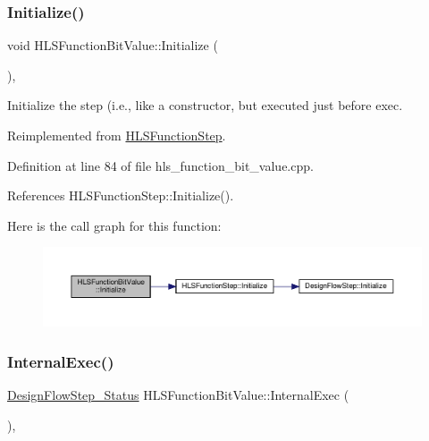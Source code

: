 \subsubsection{\texorpdfstring{Initialize()}{Initialize()}}
{\footnotesize\ttfamily void H\+L\+S\+Function\+Bit\+Value\+::\+Initialize (\begin{DoxyParamCaption}{ }\end{DoxyParamCaption})\hspace{0.3cm}{\ttfamily [override]}, {\ttfamily [virtual]}}



Initialize the step (i.\+e., like a constructor, but executed just before exec. 



Reimplemented from \hyperlink{classHLSFunctionStep_a966629ba62a8188ff4fa783ab0d4e319}{H\+L\+S\+Function\+Step}.



Definition at line 84 of file hls\+\_\+function\+\_\+bit\+\_\+value.\+cpp.



References H\+L\+S\+Function\+Step\+::\+Initialize().

Here is the call graph for this function\+:
\nopagebreak
\begin{figure}[H]
\begin{center}
\leavevmode
\includegraphics[width=350pt]{d5/d41/classHLSFunctionBitValue_aded992799d0c15347a1012e90ebd914a_cgraph}
\end{center}
\end{figure}
\mbox{\label{classHLSFunctionBitValue_aecc51d6904e74796099fac392b818e7b}} 
\subsubsection{\texorpdfstring{Internal\+Exec()}{InternalExec()}}
{\footnotesize\ttfamily \hyperlink{design__flow__step_8hpp_afb1f0d73069c26076b8d31dbc8ebecdf}{Design\+Flow\+Step\+\_\+\+Status} H\+L\+S\+Function\+Bit\+Value\+::\+Internal\+Exec (\begin{DoxyParamCaption}{ }\end{DoxyParamCaption})\hspace{0.3cm}{\ttfamily [override]}, {\ttfamily [virtual]}}




